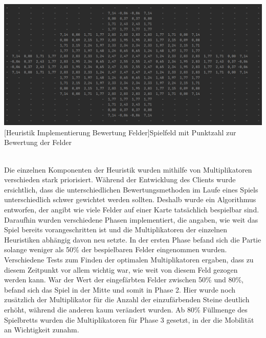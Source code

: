 \documentclass[12pt,a4paper,bibliography=totocnumbered,listof=totocnumbered]{article}
\begin{document}
\vspace{1em}
\begin{minipage}{\linewidth}
	\centering
	\includegraphics[width=\linewidth]{pics/heuristics_implementation_field_values_matrix.png}
	[Heuristik Implementierung Bewertung Felder]{Spielfeld mit Punktzahl zur Bewertung der Felder}
	\label{fig:example_heuristics_implementation_field_values_matrix}
\end{minipage} 
\\

Die einzelnen Komponenten der Heuristik wurden mithilfe von Multiplikatoren verschieden stark priorisiert. Während der Entwicklung des Clients wurde ersichtlich, dass die unterschiedlichen Bewertungsmethoden im Laufe eines Spiels unterschiedlich schwer gewichtet werden sollten. Deshalb wurde ein Algorithmus entworfen, der angibt wie viele Felder auf einer Karte tatsächlich bespielbar sind. Daraufhin wurden verschiedene Phasen implementiert, die angaben, wie weit das Spiel bereits vorangeschritten ist und die Multiplikatoren der einzelnen Heuristiken abhängig davon neu setzte. In der ersten Phase befand sich die Partie solange weniger als 50\% der bespielbaren Felder eingenommen wurden. Verschiedene Tests zum Finden der optimalen Multiplikatoren ergaben, dass zu diesem Zeitpunkt vor allem wichtig war, wie weit von diesem Feld gezogen werden kann. War der Wert der eingefärbten Felder zwischen 50\% und 80\%, befand sich das Spiel in der Mitte und somit in Phase 2. Hier wurde noch zusätzlich der Multiplikator für die Anzahl der einzufärbenden Steine deutlich erhöht, während die anderen kaum verändert wurden. Ab 80\% Füllmenge des Spielbretts wurden die Multiplikatoren für Phase 3 gesetzt, in der die Mobilität an Wichtigkeit zunahm.
 
\newpage
\end{document}

